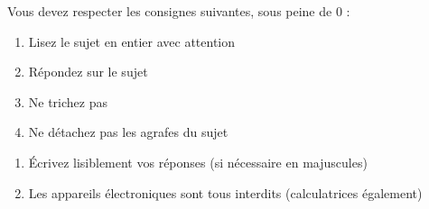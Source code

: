 \documentclass[11pt,a4paper]{article}
\begin{document}
\MakeExamTitleDuree     %


\bigskip

Vous devez respecter les consignes suivantes, sous peine de 0 :

\begin{table}[ht!]
  \begin{minipage}{0.45\textwidth}

\begin{enumerate}[label=\Roman*)]
\item Lisez le sujet en entier avec attention
\item Répondez sur le sujet
\item Ne trichez pas
\item Ne détachez pas les agrafes du sujet
\end{enumerate}

  \end{minipage}
  \hfillx
  \begin{minipage}{0.55\textwidth}

\begin{enumerate}[label=\Roman*),start=5]
\item \'Ecrivez lisiblement vos réponses (si nécessaire en majuscules)
\item Les appareils électroniques sont tous interdits (calculatrices également)
\end{enumerate}

  \end{minipage}
\end{table}




\end{document}
